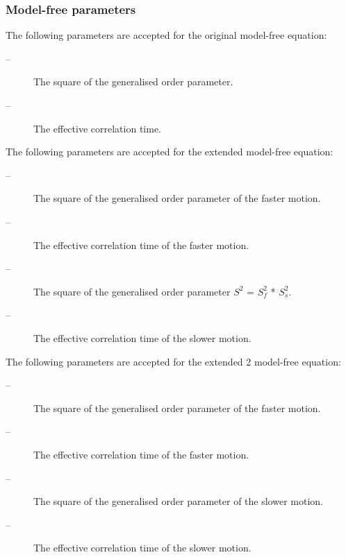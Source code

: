   
 \subsubsection{Model-free parameters} 

 The following parameters are accepted for the original model-free equation: 
  

 \begin{description} 
 \item[ --]   The square of the generalised order parameter.  
 \item[ --]   The effective correlation time.  
 \end{description} 
  

 The following parameters are accepted for the extended model-free equation: 
  

 \begin{description} 
 \item[ --]  The square of the generalised order parameter of the faster motion.  
 \item[ --]   The effective correlation time of the faster motion.  
 \item[ --]   The square of the generalised order parameter $S^2$ = $S^2_f$ * $S^2_s$.  
 \item[ --]   The effective correlation time of the slower motion.  
 \end{description} 
  

 The following parameters are accepted for the extended 2 model-free equation: 
  

 \begin{description} 
 \item[ --]  The square of the generalised order parameter of the faster motion.  
 \item[ --]   The effective correlation time of the faster motion.  
 \item[ --]  The square of the generalised order parameter of the slower motion.  
 \item[ --]   The effective correlation time of the slower motion.  
 \end{description} 
  

